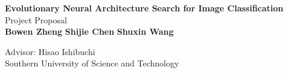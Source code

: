 \documentclass{article}
\begin{document}
	\begin{center}
    
    
		\LARGE{\textbf{Evolutionary Neural Architecture Search for Image Classification}} \\
        \vspace{1em}
        \Large{Project Proposal} \\
        \vspace{1em}
        \normalsize\textbf{ Bowen Zheng   }  
        \normalsize\textbf{ Shijie Chen   } 
        \normalsize\textbf{ Shuxin Wang  } 
        
        \vspace{1em}
        \normalsize{Advisor: Hisao Ishibuchi} \\
        \vspace{1em}
        \normalsize{Southern University of Science and Technology} 
	\end{center}
\end{document}
